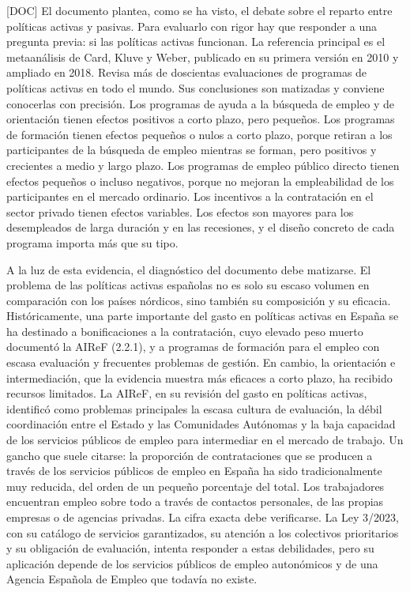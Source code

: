 \documentclass[10pt,a4paper]{article}
\begin{document}
[DOC] El documento plantea, como se ha visto, el debate sobre el reparto entre políticas activas y pasivas. Para evaluarlo con rigor hay que responder a una pregunta previa: si las políticas activas funcionan. La referencia principal es el metaanálisis de Card, Kluve y Weber, publicado en su primera versión en 2010 y ampliado en 2018. Revisa más de doscientas evaluaciones de programas de políticas activas en todo el mundo. Sus conclusiones son matizadas y conviene conocerlas con precisión. Los programas de ayuda a la búsqueda de empleo y de orientación tienen efectos positivos a corto plazo, pero pequeños. Los programas de formación tienen efectos pequeños o nulos a corto plazo, porque retiran a los participantes de la búsqueda de empleo mientras se forman, pero positivos y crecientes a medio y largo plazo. Los programas de empleo público directo tienen efectos pequeños o incluso negativos, porque no mejoran la empleabilidad de los participantes en el mercado ordinario. Los incentivos a la contratación en el sector privado tienen efectos variables. Los efectos son mayores para los desempleados de larga duración y en las recesiones, y el diseño concreto de cada programa importa más que su tipo.

A la luz de esta evidencia, el diagnóstico del documento debe matizarse. El problema de las políticas activas españolas no es solo su escaso volumen en comparación con los países nórdicos, sino también su composición y su eficacia. Históricamente, una parte importante del gasto en políticas activas en España se ha destinado a bonificaciones a la contratación, cuyo elevado peso muerto documentó la AIReF (2.2.1), y a programas de formación para el empleo con escasa evaluación y frecuentes problemas de gestión. En cambio, la orientación e intermediación, que la evidencia muestra más eficaces a corto plazo, ha recibido recursos limitados. La AIReF, en su revisión del gasto en políticas activas, identificó como problemas principales la escasa cultura de evaluación, la débil coordinación entre el Estado y las Comunidades Autónomas y la baja capacidad de los servicios públicos de empleo para intermediar en el mercado de trabajo. Un gancho que suele citarse: la proporción de contrataciones que se producen a través de los servicios públicos de empleo en España ha sido tradicionalmente muy reducida, del orden de un pequeño porcentaje del total. Los trabajadores encuentran empleo sobre todo a través de contactos personales, de las propias empresas o de agencias privadas. La cifra exacta debe verificarse. La Ley 3/2023, con su catálogo de servicios garantizados, su atención a los colectivos prioritarios y su obligación de evaluación, intenta responder a estas debilidades, pero su aplicación depende de los servicios públicos de empleo autonómicos y de una Agencia Española de Empleo que todavía no existe.
\end{document}
